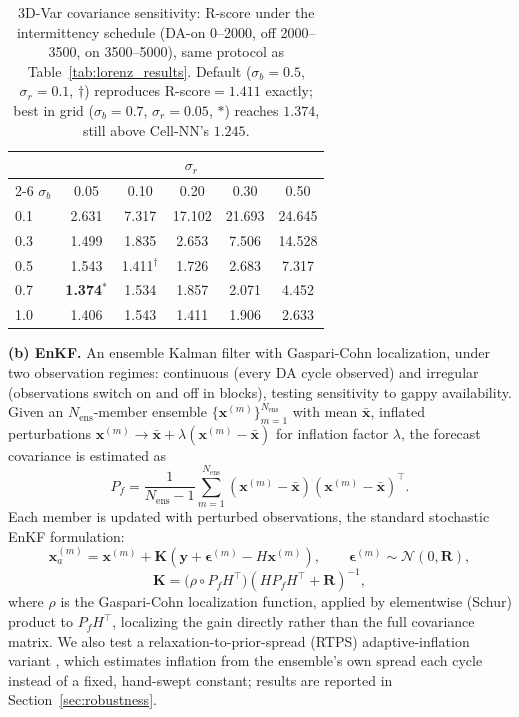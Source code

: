 \documentclass[final,5p,times,twocolumn,authoryear]{elsarticle}
\begin{document}
\begin{table}[t]
\centering
\small
\caption{3D-Var covariance sensitivity: R-score under the
intermittency schedule (DA-on 0--2000, off 2000--3500, on
3500--5000), same protocol as Table~\ref{tab:lorenz_results}.
Default ($\sigma_b=0.5$, $\sigma_r=0.1$, $\dag$) reproduces
R-score$=1.411$ exactly; best in grid ($\sigma_b=0.7$,
$\sigma_r=0.05$, $\ast$) reaches $1.374$, still above Cell-NN's
$1.245$.}
\label{tab:threedvar_sensitivity}
\begin{tabular}{lccccc}
\toprule
 & \multicolumn{5}{c}{$\sigma_r$} \\
\cmidrule(lr){2-6}
$\sigma_b$ & 0.05 & 0.10 & 0.20 & 0.30 & 0.50 \\
\midrule
0.1 & 2.631 & 7.317 & 17.102 & 21.693 & 24.645 \\
0.3 & 1.499 & 1.835 & 2.653 & 7.506 & 14.528 \\
0.5 & 1.543 & 1.411$^\dag$ & 1.726 & 2.683 & 7.317 \\
0.7 & \textbf{1.374}$^\ast$ & 1.534 & 1.857 & 2.071 & 4.452 \\
1.0 & 1.406 & 1.543 & 1.411 & 1.906 & 2.633 \\
\bottomrule
\end{tabular}
\end{table}

\textbf{(b) EnKF.} An ensemble Kalman filter with Gaspari-Cohn
localization, under two observation regimes: continuous (every DA
cycle observed) and irregular (observations switch on and off in
blocks), testing sensitivity to gappy availability. Given an
$N_\text{ens}$-member ensemble $\{\mathbf{x}^{(m)}\}_{m=1}^{N_\text{ens}}$
with mean $\bar{\mathbf{x}}$, inflated perturbations
$\mathbf{x}^{(m)} \to \bar{\mathbf{x}} + \lambda(\mathbf{x}^{(m)} -
\bar{\mathbf{x}})$ for inflation factor $\lambda$, the forecast
covariance is estimated as
\begin{equation}
P_f = \frac{1}{N_\text{ens}-1} \sum_{m=1}^{N_\text{ens}}
(\mathbf{x}^{(m)}-\bar{\mathbf{x}})(\mathbf{x}^{(m)}-\bar{\mathbf{x}})^\top.
\label{eq:enkf_cov}
\end{equation}
Each member is updated with perturbed observations, the standard
stochastic EnKF formulation:
\begin{equation}
\mathbf{x}_a^{(m)} = \mathbf{x}^{(m)} + \mathbf{K}\left(\mathbf{y} +
\boldsymbol{\epsilon}^{(m)} - H\mathbf{x}^{(m)}\right), \qquad
\boldsymbol{\epsilon}^{(m)} \sim \mathcal{N}(0,\mathbf{R}),
\label{eq:enkf_update}
\end{equation}
\begin{equation}
\mathbf{K} = \bigl(\rho \circ P_f H^\top\bigr)
\left(HP_fH^\top + \mathbf{R}\right)^{-1},
\label{eq:enkf_gain}
\end{equation}
where $\rho$ is the Gaspari-Cohn localization function, applied by
elementwise (Schur) product to $P_f H^\top$, localizing the gain
directly rather than the full covariance matrix. We also test a
relaxation-to-prior-spread (RTPS) adaptive-inflation variant
\citep{whitaker2012rtps}, which estimates inflation from the
ensemble's own spread each cycle instead of a fixed, hand-swept
constant; results are reported in Section~\ref{sec:robustness}.
\end{document}
